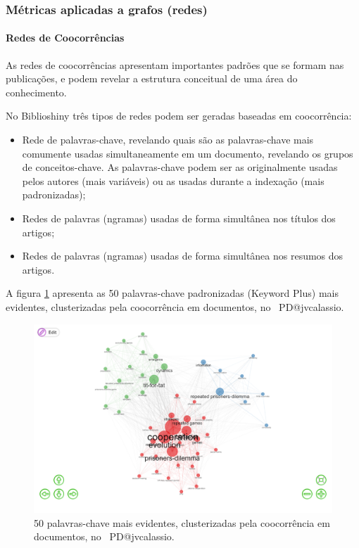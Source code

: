 \subsubsection{Métricas aplicadas a grafos (redes)}

\paragraph{Redes de Coocorrências}

As redes de coocorrências apresentam importantes padrões que se formam nas publicações, e podem revelar a estrutura conceitual de uma área do conhecimento.

No Biblioshiny três tipos de redes podem ser geradas baseadas em coocorrência:
\begin{itemize}
    \item Rede de palavras-chave, revelando quais são as palavras-chave mais comumente usadas simultaneamente em um documento, revelando os grupos de conceitos-chave. As palavras-chave podem ser as originalmente usadas pelos autores (mais variáveis) ou as usadas durante a indexação (mais padronizadas);
    \item Redes de palavras (ngramas) usadas de forma simultânea nos títulos dos artigos;
    \item Redes de palavras (ngramas) usadas de forma simultânea nos resumos dos artigos.
\end{itemize}

A figura \ref{fig:PD@jvcalassio:Co-occurrence-Network} apresenta as 50 palavras-chave padronizadas (Keyword Plus) mais evidentes, clusterizadas pela coocorrência em documentos, no  \dataset\ PD@jvcalassio.

\begin{figure}
    \centering
    \includegraphics[width=1\textwidth]{exploratory-data-analysis/jvcalassio/PesqBibliogr/PrisonersDilemma/WoS-20221201/Dataset/Co-occurrence-Network-2022-12-03.png}
    \caption{50 palavras-chave mais evidentes, clusterizadas pela coocorrência em documentos, no  \dataset\ PD@jvcalassio.}
    \label{fig:PD@jvcalassio:Co-occurrence-Network}
\end{figure}

